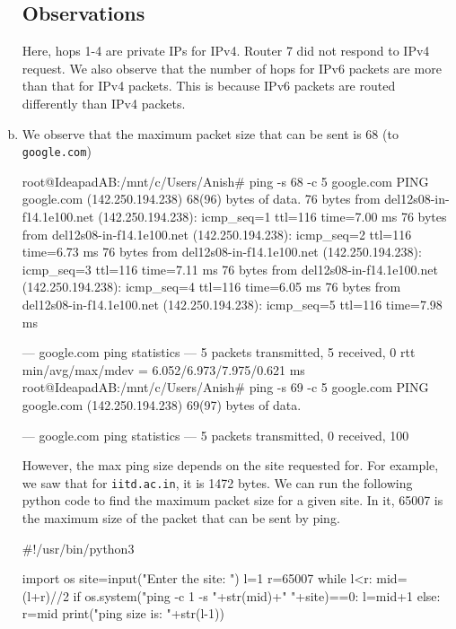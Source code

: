 \begin{enumerate}[a.]
    \subsection*{Observations}
    Here, hops 1-4 are private IPs for IPv4. Router 7 did not respond to IPv4 request. We also observe that the number of hops for IPv6 packets are more than that for IPv4 packets. This is because IPv6 packets are routed differently than IPv4 packets.

    \item We observe that the maximum packet size that can be sent is 68 (to {\tt google.com})
\begin{code}
root@IdeapadAB:/mnt/c/Users/Anish# ping -s 68 -c 5 google.com
PING google.com (142.250.194.238) 68(96) bytes of data.
76 bytes from del12s08-in-f14.1e100.net (142.250.194.238): icmp_seq=1 ttl=116 time=7.00 ms
76 bytes from del12s08-in-f14.1e100.net (142.250.194.238): icmp_seq=2 ttl=116 time=6.73 ms
76 bytes from del12s08-in-f14.1e100.net (142.250.194.238): icmp_seq=3 ttl=116 time=7.11 ms
76 bytes from del12s08-in-f14.1e100.net (142.250.194.238): icmp_seq=4 ttl=116 time=6.05 ms
76 bytes from del12s08-in-f14.1e100.net (142.250.194.238): icmp_seq=5 ttl=116 time=7.98 ms

--- google.com ping statistics ---
5 packets transmitted, 5 received, 0%
rtt min/avg/max/mdev = 6.052/6.973/7.975/0.621 ms
root@IdeapadAB:/mnt/c/Users/Anish# ping -s 69 -c 5 google.com
PING google.com (142.250.194.238) 69(97) bytes of data.

--- google.com ping statistics ---
5 packets transmitted, 0 received, 100%
\end{code}
However, the max ping size depends on the site requested for. For example, we saw that for {\tt iitd.ac.in}, it is 1472 bytes.
We can run the following python code to find the maximum packet size for a given site. In it, 65007 is the maximum size of the packet that can be sent by ping.
\begin{code}
    #!/usr/bin/python3

    import os
    site=input("Enter the site: ")
    l=1
    r=65007
    while l<r:
        mid=(l+r)//2
        if os.system("ping -c 1 -s "+str(mid)+" "+site)==0:
            l=mid+1
        else:
            r=mid
    print("\n\nMax ping size is: "+str(l-1))
\end{code}
\end{enumerate}
